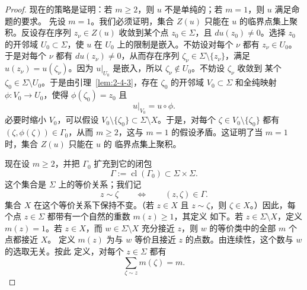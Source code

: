 \begin{proof}
现在的策略是证明：若 $m\ge2$，则 $u$ 不是单纯的；若 $m=1$，则 $u$ 满足命题的要求。
先设 $m=1$。我们必须证明，集合 $Z(u)$ 只能在 $u$ 的临界点集上聚积。反设存在序列
$z_\nu\in Z(u)$ 收敛到某个点 $z_0\in\Sigma$，且 $du(z_0)\ne0$。选择 $z_0$ 的开邻域
$U_0\subset\Sigma$，使 $u$ 在 $U_0$ 上的限制是嵌入。不妨设对每个 $\nu$ 都有
$z_\nu\in U_0$。于是对每个 $\nu$ 都有 $du(z_\nu)\ne0$，从而存在序列
$\zeta_\nu\in\Sigma\setminus\{z_\nu\}$，满足 $u(z_\nu)=u(\zeta_\nu)$。因为
$\left.u\right|_{U_0}$ 是嵌入，所以 $\zeta_\nu\notin U_0$。不妨设 $\zeta_\nu$ 收敛到
某个 $\zeta_0\in\Sigma\setminus U_0$。于是由引理~\ref{lem:2-4-3}，存在
$\zeta_0$ 的开邻域 $V_0\subset\Sigma$ 和全纯映射 $\phi:V_0\to U_0$，使得
$\phi(\zeta_0)=z_0$ 且
\[
  \left.u\right|_{V_0}=u\circ\phi.
\]
必要时缩小 $V_0$，可以假设
$V_0\setminus\{\zeta_0\}\subset\Sigma\setminus X$。于是，对每个
$\zeta\in V_0\setminus\{\zeta_0\}$ 都有 $(\zeta,\phi(\zeta))\in\Gamma_0$，从而
$m\ge2$，这与 $m=1$ 的假设矛盾。这证明了当 $m=1$ 时，集合 $Z(u)$ 只能在 $u$ 的
临界点集上聚积。

现在设 $m\ge2$，并把 $\Gamma_0$ 扩充到它的闭包
\[
  \Gamma:=\operatorname{cl}(\Gamma_0)\subset\Sigma\times\Sigma.
\]
这个集合是 $\Sigma$ 上的等价关系；我们记
\[
  z\sim\zeta
  \qquad\Longleftrightarrow\qquad
  (z,\zeta)\in\Gamma.
\]
集合 $X$ 在这个等价关系下保持不变。（若 $z\in X$ 且 $z\sim\zeta$，则
$\zeta\in X$。）因此，每个点 $z\in\Sigma$ 都带有一个自然的重数 $m(z)\ge1$，其定义
如下。若 $z\in\Sigma\setminus X$，定义 $m(z)=1$。若 $z\in X$，而
$w\in\Sigma\setminus X$ 充分接近 $z$，则 $w$ 的等价类中的全部 $m$ 个点都接近 $X$。
定义 $m(z)$ 为与 $w$ 等价且接近 $z$ 的点数。由连续性，这个数与 $w$ 的选取无关。按此
定义，对每个 $z\in\Sigma$ 都有
\[
  \sum_{\zeta\sim z}m(\zeta)=m.
\]


\end{proof}
